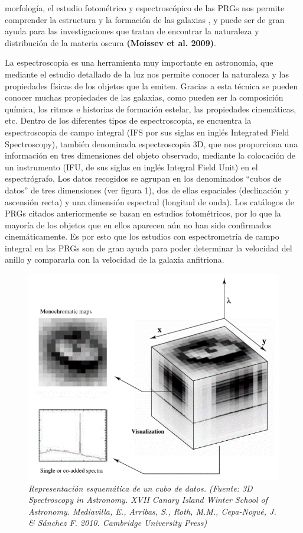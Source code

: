 \documentclass{article}
\begin{document}
morfología, el estudio fotométrico y espectroscópico de las PRGs nos permite comprender la estructura y la formación de las galaxias \cite{Iodice2014}, y puede ser de gran ayuda para las investigaciones que tratan de encontrar la naturaleza y distribución de la materia oscura \cite{Brook2008} \textbf{(Moissev et al. 2009)}.

La espectroscopia es una herramienta muy importante en astronomía, que mediante el estudio detallado de la luz nos permite conocer la naturaleza y las propiedades físicas de los objetos que la emiten. Gracias a esta técnica se pueden conocer muchas propiedades de las galaxias, como pueden ser la composición química, los ritmos e historias de formación estelar, las propiedades cinemáticas, etc. Dentro de los diferentes tipos de espectroscopia, se encuentra la espectroscopia de campo integral (IFS por sus siglas en inglés Integrated Field Spectroscopy), también denominada espectroscopia 3D, que nos proporciona una información en tres dimensiones del objeto observado, mediante la colocación de un instrumento (IFU, de sus siglas en inglés Integral Field Unit) en el espectrógrafo, Los datos recogidos se agrupan en los denominados “cubos de datos” de tres dimensiones (ver figura 1), dos de ellas espaciales (declinación y ascensión recta) y una dimensión espectral (longitud de onda). Los catálogos de PRGs citados anteriormente se basan en estudios fotométricos, por lo que la mayoría de los objetos que en ellos aparecen aún no han sido confirmados cinemáticamente. Es por esto que los estudios con espectrometría de campo integral en las PRGs son de gran ayuda para poder determinar la velocidad del anillo y compararla con la velocidad de la galaxia anfitriona.
\begin{figure}[H]
	\includegraphics[scale=.80]{imagen1.png}
	\centering	
	\caption{\emph{Representación esquemática de un cubo de datos. (Fuente: 3D Spectroscopy in Astronomy. XVII Canary Island Winter School of Astronomy. Mediavilla, E., Arribas, S., Roth, M.M., Cepa-Nogué, J. \& Sánchez F. 2010. Cambridge University Press)}}
\end{figure}
\end{document}
